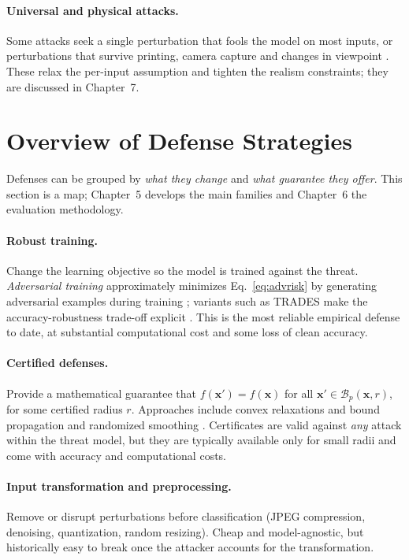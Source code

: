 \documentclass[10pt,a4paper]{extarticle}
\theoremstyle{definition}
\newcommand{\x}{\mathbf{x}}
\newcommand{\xadv}{\mathbf{x}'}
\newcommand{\B}{\mathcal{B}}
\begin{document}
\paragraph{Universal and physical attacks.} Some attacks seek a single perturbation that fools the model on most inputs, or perturbations that survive printing, camera capture and changes in viewpoint \citep{kurakin2017physical,athalye2018eot}. These relax the per-input assumption and tighten the realism constraints; they are discussed in Chapter~7.

\section{Overview of Defense Strategies}

Defenses can be grouped by \emph{what they change} and \emph{what guarantee they offer}. This section is a map; Chapter~5 develops the main families and Chapter~6 the evaluation methodology.

\paragraph{Robust training.} Change the learning objective so the model is trained against the threat. \emph{Adversarial training} approximately minimizes Eq.~\eqref{eq:advrisk} by generating adversarial examples during training \citep{goodfellow2015explaining,madry2018towards}; variants such as TRADES make the accuracy-robustness trade-off explicit \citep{zhang2019trades}. This is the most reliable empirical defense to date, at substantial computational cost and some loss of clean accuracy.

\paragraph{Certified defenses.} Provide a mathematical guarantee that \(f(\xadv) = f(\x)\) for all \(\xadv \in \B_p(\x, r)\), for some certified radius \(r\). Approaches include convex relaxations and bound propagation \citep{wong2018provable} and randomized smoothing \citep{cohen2019certified}. Certificates are valid against \emph{any} attack within the threat model, but they are typically available only for small radii and come with accuracy and computational costs.

\paragraph{Input transformation and preprocessing.} Remove or disrupt perturbations before classification (JPEG compression, denoising, quantization, random resizing). Cheap and model-agnostic, but historically easy to break once the attacker accounts for the transformation.
\end{document}
